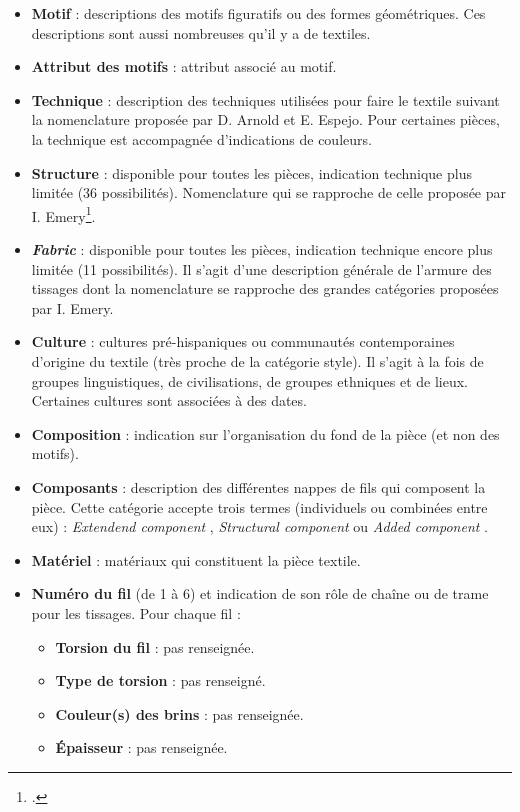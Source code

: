 \begin{citer}
\begin{itemize}
		\item  \textbf{Motif} : descriptions des motifs figuratifs ou des formes géométriques. Ces descriptions sont aussi nombreuses qu'il y a de textiles.
		\item  \textbf{Attribut des motifs} : attribut associé au motif.
		\item  \textbf{Technique} : description des techniques utilisées pour faire le textile suivant la nomenclature proposée par D. Arnold et E. Espejo. Pour certaines pièces, la technique est accompagnée d'indications de couleurs.
		\item  \textbf{Structure} : disponible pour toutes les pièces, indication technique plus limitée (36 possibilités). Nomenclature qui se rapproche de celle proposée par I. Emery\footcite{emeryPrimaryStructuresFabrics1995}. 
		\item  \textbf{\og \textit{Fabric} \fg} : disponible pour toutes les pièces, indication technique encore plus limitée (11 possibilités). Il s'agit d'une description générale de l'armure des tissages dont la nomenclature se rapproche des grandes catégories proposées par I. Emery. 
		\item  \textbf{Culture} : cultures pré-hispaniques ou communautés contemporaines d'origine du textile (très proche de la catégorie style). Il s'agit à la fois de groupes linguistiques, de civilisations, de groupes ethniques et de lieux. Certaines cultures sont associées à des dates.
		\item  \textbf{Composition} : indication sur l'organisation du fond de la pièce (et non des motifs).		
		\item  \textbf{Composants} : description des différentes nappes de fils qui composent la pièce. Cette catégorie accepte trois termes (individuels ou combinées entre eux) : \og \textit{Extendend component} \fg, \og \textit{Structural component} \fg\: ou \og \textit{Added component} \fg.
		\item  \textbf{Matériel} : matériaux qui constituent la pièce textile.
		\item  \textbf{Numéro du fil} (de 1 à 6) et indication de son rôle de chaîne ou de trame pour les tissages. Pour chaque fil : 
			\begin{itemize}
			\item  \textbf{Torsion du fil} : pas renseignée.
			\item \textbf{Type de torsion} : pas renseigné.
			\item  \textbf{Couleur(s) des brins} : pas renseignée.
			\item  \textbf{Épaisseur} : pas renseignée.

\end{itemize}
\end{itemize}
\end{citer}
